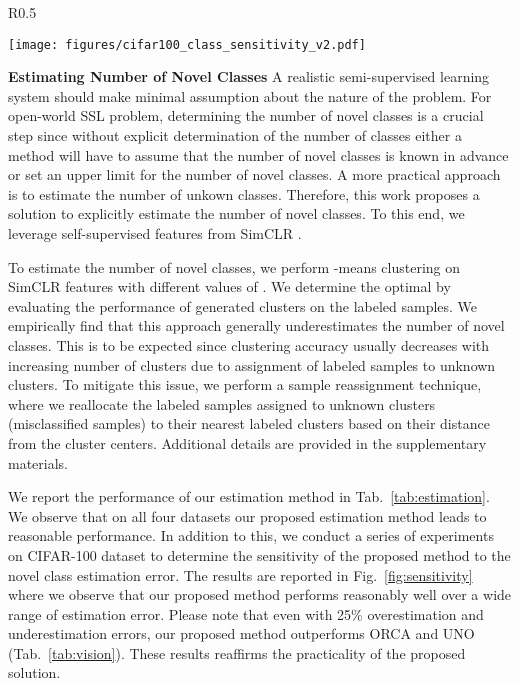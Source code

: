 \documentclass[runningheads]{eccv2022submission}
\begin{document}
\begin{wrapfigure}{R}{0.5\textwidth}
\vspace{-10mm}
\begin{center}
  \texttt{[image: figures/cifar100\_class\_sensitivity\_v2.pdf]}
\end{center}
\vspace{-6mm}
\caption{Accuracy as a function of class estimation error on \textbf{CIFAR-100} dataset.}
\vspace{-4mm}
\label{fig:sensitivity}
\end{wrapfigure}

\vspace{1mm}
\label{par:novel_estimation}
\noindent \textbf{Estimating Number of Novel Classes} A realistic semi-supervised learning system should make minimal assumption about the nature of the problem. For open-world SSL problem, determining the number of novel classes is a crucial step since without explicit determination of the number of classes either a method will have to assume that the number of novel classes is known in advance or set an upper limit for the number of novel classes. A more practical approach is to estimate the number of unkown classes. Therefore, this work proposes a solution to explicitly estimate the number of novel classes. To this end, we leverage self-supervised features from SimCLR \cite{chen2020simple}. 

To estimate the number of novel classes, we perform -means clustering on SimCLR features with different values of . We determine the optimal  by evaluating the performance of generated clusters on the labeled samples. We empirically find that this approach generally underestimates the number of novel classes. This is to be expected since clustering accuracy usually decreases with increasing number of clusters due to assignment of labeled samples to unknown clusters. To mitigate this issue, we perform a sample reassignment technique, where we reallocate the labeled samples assigned to unknown clusters (misclassified samples) to their nearest labeled clusters based on their distance from the cluster centers. Additional details are provided in the supplementary materials.

We report the performance of our estimation method in Tab.~\ref{tab:estimation}. We observe that on all four datasets our proposed estimation method leads to reasonable performance. In addition to this, we conduct a series of experiments on CIFAR-100 dataset to determine the sensitivity of the proposed method to the novel class estimation error. The results are reported in Fig.~\ref{fig:sensitivity} where we observe that our proposed method performs reasonably well over a wide range of estimation error. Please note that even with 25\% overestimation and underestimation errors, our proposed method outperforms ORCA and UNO (Tab.~\ref{tab:vision}). These results reaffirms the practicality of the proposed solution.     
\end{document}
